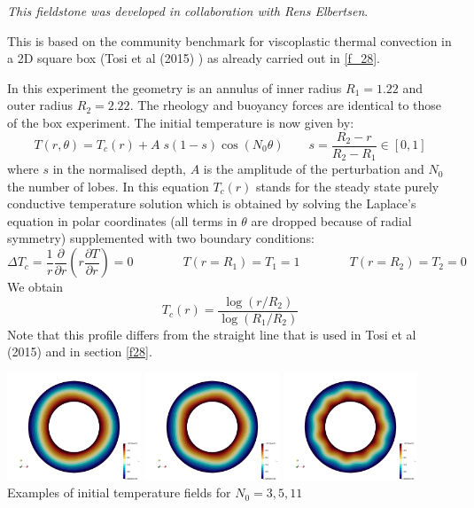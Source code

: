 
{\sl This fieldstone was developed in collaboration with Rens Elbertsen}. 

This is based on the community benchmark for viscoplastic thermal convection
in a 2D square box (Tosi et al (2015) \cite{tosn15}) as already carried out in \ref{f_28}.

In this experiment the geometry is an annulus of inner radius 
$R_1=1.22$ and outer radius $R_2=2.22$. 
The rheology and buoyancy forces are identical to those of the box 
experiment. The initial temperature is now given by:
\[
T(r,\theta) = T_c(r)+A\; s(1-s) \cos(N_0 \theta)
\quad\quad s=\frac{R_2-r}{R_2-R_1} \in [0,1]
\]
where $s$ in the normalised depth, $A$ is the amplitude of the perturbation and $N_0$ the 
number of lobes. In this equation $T_c(r)$ stands for the steady state purely conductive 
temperature solution which is obtained by solving the Laplace's equation in 
polar coordinates (all terms in $\theta$ are dropped because of radial symmetry) 
supplemented with two boundary conditions:
\[
\Delta T_c = \frac{1}{r}\frac{\partial }{\partial r} \left( r \frac{\partial T}{\partial r} \right) =0 
\quad\quad
\quad\quad
T(r=R_1)=T_1=1
\quad\quad
\quad\quad
T(r=R_2)=T_2=0
\]
We obtain 
\[
T_c(r)=\frac{\log (r/R_2)}{\log(R_1/R_2)}
\]
Note that this profile differs from the straight line that is used in Tosi et al (2015) \cite{tosn15} and in section \ref{f28}.

\begin{center}
\includegraphics[width=4cm]{python_codes/fieldstone_33/images/T_N03}
\includegraphics[width=4cm]{python_codes/fieldstone_33/images/T_N05}
\includegraphics[width=4cm]{python_codes/fieldstone_33/images/T_N11}\\
{\small Examples of initial temperature fields for $N_0=3,5,11$}
\end{center}

